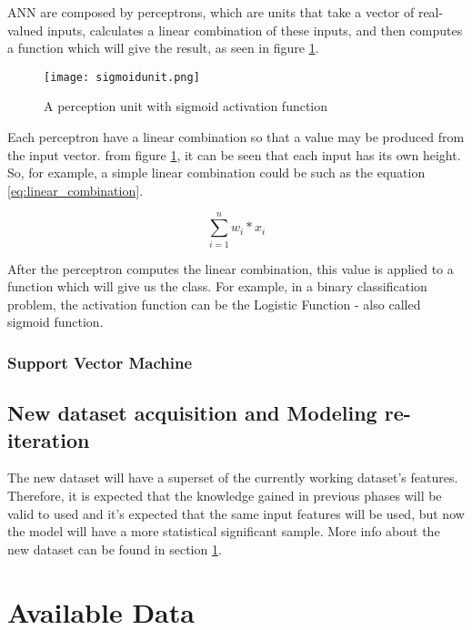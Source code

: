 ANN are composed by perceptrons, which are units that take a vector of real-valued inputs, calculates a linear combination of these inputs, and then computes a function which will give the result, as seen in figure \ref{fig:sigmoid_unit}.

\begin{figure}[htpb]
\centering
\texttt{[image: sigmoidunit.png]}
\caption{A perception unit with sigmoid activation function}
\label{fig:sigmoid_unit}
\end{figure}

Each perceptron have a linear combination so that a value may be produced from the input vector. from figure \ref{fig:sigmoid_unit}, it can be seen that each input has its own height. So, for example, a simple linear combination could be such as the equation \ref{eq:linear_combination}.

\begin{equation} 
\label{eq:linear_combination}
\sum_{i=1}^{n} w_{i}*x_{i}
\end{equation}

After the perceptron computes the linear combination, this value is applied to a function which will give us the class. For example, in a binary classification problem, the activation function can be the Logistic Function - also called sigmoid function.

\subsubsection{Support Vector Machine}

\subsection{New dataset acquisition and Modeling re-iteration}
\label{subsec:reiteration}

The new dataset will have a superset of the currently working dataset's features. Therefore, it is expected that the knowledge gained in previous phases will be valid to used and it's expected that the same input features will be used, but now the model will have a more statistical significant sample. More info about the new dataset can be found in section \ref{sec:available_data}.


\section{Available Data}
\label{sec:available_data}
